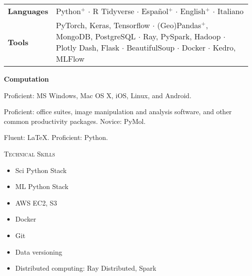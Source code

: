 \documentclass[a4paper,12pt]{article}
\begin{document}
    \vspace{-1em}
    \begin{tabularx}{\textwidth}{p{2.5cm}>{\arraybackslash}X}
        \bfseries{Languages} & Python$^+$ $\cdot$ R Tidyverse $\cdot$ Espa\~nol$^+$ $\cdot$ English$^+$ $\cdot$ Italiano                                                                                                                \\  %
        \bfseries{Tools}     & PyTorch, Keras, Tensorflow $\cdot$ (Geo)Pandas$^+$, \mbox{MongoDB}, PostgreSQL $\cdot$ Ray, PySpark, Hadoop $\cdot$ Plotly Dash, Flask $\cdot$ BeautifulSoup $\cdot$ Docker $\cdot$ Kedro, MLFlow \\
    \end{tabularx}

    \textbf{Computation}
    \begin{description}
        \setlength{\itemsep}{0mm}
        \item[Operating Systems] Proficient: MS Windows, Mac OS X, iOS, Linux, and Android.
        \item[Software] Proficient: office suites, image manipulation and analysis software, and other common productivity packages. Novice: PyMol.
        \item[Programming] Fluent: \LaTeX. Proficient: Python.
    \end{description}

    \textsc{Technical Skills}\vspace*{-15pt}
    \begin{multicols}{2}
        \begin{itemize}[leftmargin=0.4cm]
            \item Sci Python Stack
            \item ML Python Stack
            \item AWS EC2, S3
            \item Docker
            \item Git
            \item Data versioning
            \item Distributed computing: Ray Distributed, Spark
        \end{itemize}
    \end{multicols}
\end{document}
